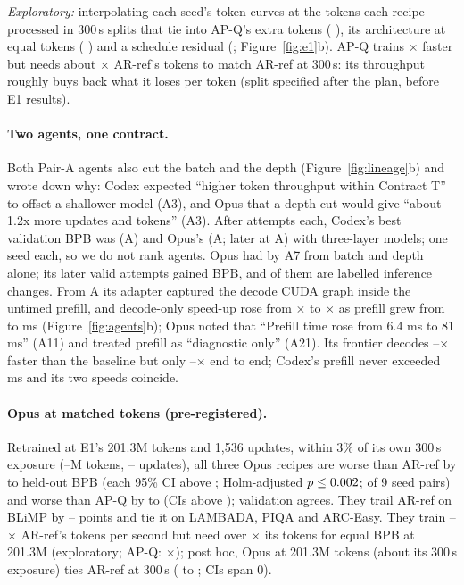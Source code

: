 \documentclass{article}
\begin{document}
\emph{Exploratory:} interpolating each seed's token curves at the tokens each recipe processed in 300\,s splits that tie into AP-Q's extra tokens (\CREOneExposure{} \CREOneExposureCI), its architecture at equal tokens (\CREOneArch{} \CREOneArchCI) and a schedule residual (\CREOneSched; Figure~\ref{fig:e1}b). AP-Q trains \CREOneRho$\times$ faster but needs about \CREOneK$\times$ \CREOneKCI{} AR-ref's tokens to match AR-ref at 300\,s: its throughput roughly buys back what it loses per token (split specified after the plan, before E1 results).

\paragraph{Two agents, one contract.} Both Pair-A agents also cut the batch and the depth (Figure~\ref{fig:lineage}b) and wrote down why: Codex expected ``higher token throughput within Contract T'' to offset a shallower model (A3), and Opus that a depth cut would give ``about 1.2x more updates and tokens'' (A3). After \CRCxAttempts{} attempts each, Codex's best validation BPB was \CRCxBestBPB{} (A\CRCxBestAttempt) and Opus's \CROpBestTwentyTwo{} (A\CROpBestTwentyTwoAttempt; later \CROpBestBPB{} at A\CROpBestAttempt) with three-layer models; one seed each, so we do not rank agents. Opus had \CROpBestSeven{} by A7 from batch and depth alone; its \CROpLateDone{} later valid attempts gained \CROpLateGain{} BPB, and \CROpLateInf{} of them are labelled inference changes. From A\CROpAdapterAttempt{} its adapter captured the decode CUDA graph inside the untimed prefill, and decode-only speed-up rose from \CROpPreAdapterDecode$\times$ to \CROpAdapterDecode$\times$ as prefill grew from \CROpPreAdapterPrefill{} to \CROpAdapterPrefill{} ms (Figure~\ref{fig:agents}b); Opus noted that ``Prefill time rose from 6.4 ms to 81 ms'' (A11) and treated prefill as ``diagnostic only'' (A21). Its frontier decodes \CROpDecodeLo--\CROpDecodeHi$\times$ faster than the baseline but only \CROpEtoELo--\CROpEtoEHi$\times$ end to end; Codex's prefill never exceeded \CRCxMaxPrefill{} ms and its two speeds coincide.

\paragraph{Opus at matched tokens (pre-registered).} Retrained at E1's 201.3M tokens and 1{,}536 updates, within 3\% of its own 300\,s exposure (\CROpTokLo--\CROpTokHi M tokens, \CROpUpdLo--\CROpUpdHi{} updates), all three Opus recipes are worse than AR-ref by \CRMTDLo{} to \CRMTDHi{} held-out BPB (each 95\% CI above \CRMTCIMin; Holm-adjusted $p\le0.002$; \CRMTPairs{} of 9 seed pairs) and worse than AP-Q by \CRMTDAPLo{} to \CRMTDAPHi{} (CIs above \CRMTDAPCIMin); validation agrees. They trail AR-ref on BLiMP by \CRMTBlimpLoPts--\CRMTBlimpHiPts{} points and tie it on LAMBADA, PIQA and ARC-Easy. They train \CRMTRhoLo--\CRMTRhoHi$\times$ AR-ref's tokens per second but need over \CRMTKBound$\times$ its tokens for equal BPB at 201.3M (exploratory; AP-Q: \CRMTKAPQ$\times$); post hoc, Opus at 201.3M tokens (about its 300\,s exposure) ties AR-ref at 300\,s (\CRMTPostLo{} to \CRMTPostHi; CIs span 0).
\end{document}
